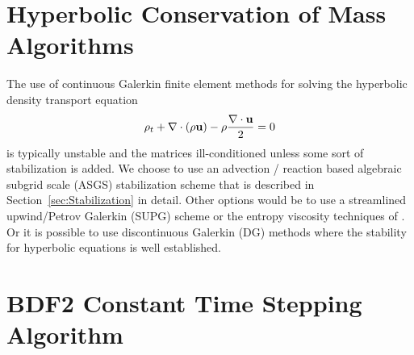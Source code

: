 \documentclass[letterpaper]{erdc}
\begin{document}
%



%
%
%
\section{Hyperbolic Conservation of Mass Algorithms}\label{sec:ConservationOfMassNumericalApproach}
The use of continuous Galerkin finite element methods for solving the
hyperbolic density transport equation
\begin{equation}
  \rho_t + \nabla\cdot(\rho\textbf{u}) - \rho\frac{\nabla\cdot\textbf{u}}{2} = 0
\end{equation}
is typically unstable and the matrices ill-conditioned unless some sort of
stabilization is added.  We choose to use an advection / reaction based
algebraic subgrid scale (ASGS) stabilization scheme that is described in
Section~\ref{sec:Stabilization} in detail.  Other options would be to use a
streamlined upwind/Petrov Galerkin (SUPG) scheme or the entropy viscosity
techniques of \cite{guermond2011entropy}.  Or it is possible to use
discontinuous Galerkin (DG) methods where the stability for hyperbolic
equations is well established.



%
%
%
\section{BDF2 Constant Time Stepping Algorithm}\label{sec:BDF2ConstantTimeSteppingAlgorithm}
\end{document}
